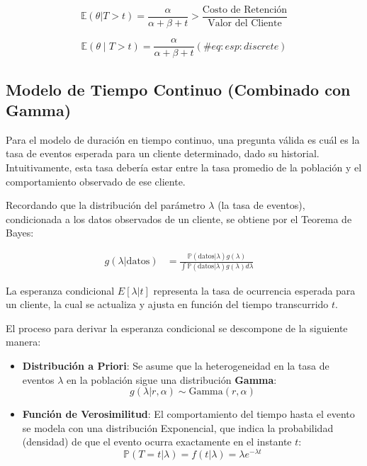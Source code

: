 \documentclass[
]{book}
\begin{document}
\[\mathbb{E} (\theta|T > t) = \frac{\alpha}{\alpha + \beta + t} > \frac{\text{Costo de Retención}}{\text{Valor del Cliente}}\]

\[
\mathbb{E}(\theta \mid T>t) = \frac{\alpha}{\alpha + \beta + t} (\#eq:esp:discrete)
\]

\subsection{Modelo de Tiempo Continuo (Combinado con Gamma)}\label{modelo-de-tiempo-continuo-combinado-con-gamma}

Para el modelo de duración en tiempo continuo, una pregunta válida es
cuál es la tasa de eventos esperada para un cliente determinado, dado su
historial. Intuitivamente, esta tasa debería estar entre la tasa
promedio de la población y el comportamiento observado de ese cliente.

Recordando que la distribución del parámetro \(\lambda\) (la tasa de
eventos), condicionada a los datos observados de un cliente, se obtiene
por el Teorema de Bayes:

\[ 
\begin{aligned}
g(\lambda|\text{datos}) &= \frac{\mathbb{P}(\text{datos}|\lambda)g(\lambda)}{\int \mathbb{P}(\text{datos}|\lambda)g(\lambda)d\lambda}
\end{aligned}
\quad \label{eq:thetabayes} 
\]

La esperanza condicional \(E[\lambda|t]\) representa la tasa de ocurrencia
esperada para un cliente, la cual se actualiza y ajusta en función del
tiempo transcurrido \(t\).

El proceso para derivar la esperanza condicional se descompone de la
siguiente manera:

\begin{itemize}
\item
  \textbf{Distribución a Priori}: Se asume que la heterogeneidad en la tasa
  de eventos \(\lambda\) en la población sigue una distribución
  \textbf{Gamma}: \[ g(\lambda|r, \alpha) \sim \text{Gamma}(r, \alpha) \]
\item
  \textbf{Función de Verosimilitud}: El comportamiento del tiempo hasta el
  evento se modela con una distribución Exponencial, que indica la
  probabilidad (densidad) de que el evento ocurra exactamente en el
  instante \(t\):
  \[ \mathbb{P}(T=t|\lambda) = f(t|\lambda) = \lambda e^{-\lambda t} \]
\end{itemize}
\end{document}
